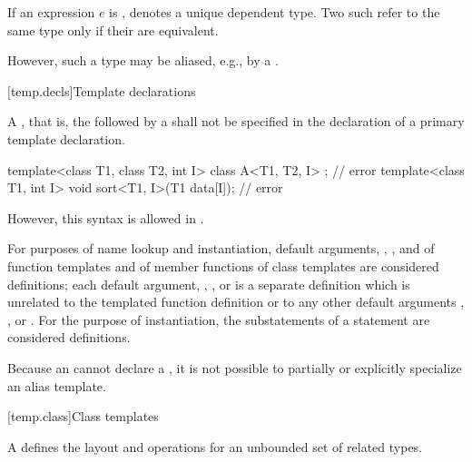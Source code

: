 \pnum
If an expression $e$ is ,
denotes a unique dependent type. Two such 
refer to the same type only if their  are
equivalent.
\begin{note}
However, such a type may be aliased,
e.g., by a .
\end{note}

[temp.decls]{Template declarations}

\pnum
A
,
that is, the
followed by a
shall not be specified in the declaration of a primary template declaration.
\begin{example}
\begin{codeblock}
template<class T1, class T2, int I> class A<T1, T2, I> { };     // error
template<class T1, int I> void sort<T1, I>(T1 data[I]);         // error
\end{codeblock}
\end{example}
\begin{note}
However, this syntax is allowed in .
\end{note}

\pnum
For purposes of name lookup and instantiation,
default arguments,
,
,
and
of function templates
and
of member functions of class templates
are considered definitions;
each
default argument,
,
,
or
is a separate definition
which is unrelated
to the templated function definition or
to any other
default arguments
,
,
or
.
For the purpose of instantiation, the substatements of a
 statement are considered definitions.

\pnum
Because an  cannot declare a
, it is not possible to partially or
explicitly specialize an alias template.

[temp.class]{Class templates}

\pnum
A
defines the layout and operations
for an unbounded set of related types.


